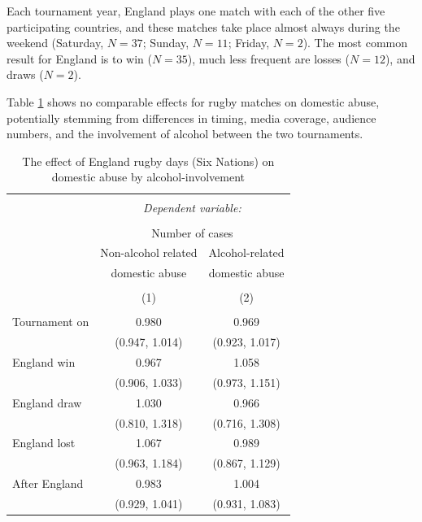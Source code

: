 \documentclass[12pt, a4paper]{article}
\begin{document}
Each tournament year, England plays one match with each of the other five participating countries, and these matches take place almost always during the weekend (Saturday, $N = 37$; Sunday, $N = 11$; Friday, $N = 2$). The most common result for England is to win ($N = 35$), much less frequent are losses ($N = 12$), and draws ($N = 2$).


Table \ref{rugby} shows no comparable effects for rugby matches on domestic abuse, potentially stemming from differences in timing, media coverage, audience numbers, and the involvement of alcohol between the two tournaments. 


\begin{table}[!htbp] \centering 
  \begin{threeparttable}
  \caption{The effect of England rugby days (Six Nations) on domestic abuse by alcohol-involvement} 
  \label{rugby} 
\begin{tabular}{@{\extracolsep{5pt}}lcc} 
\\[-1.8ex]\hline 
\hline \\[-1.8ex] 
 & \multicolumn{2}{c}{\textit{Dependent variable:}} \\ 
\cline{2-3} 
\\[-1.8ex] & \multicolumn{2}{c}{Number of cases} \\ 
 & Non-alcohol related & Alcohol-related\\ 
 & domestic abuse & domestic abuse\\
\\[-1.8ex] & (1) & (2)\\ 
\hline \\[-1.8ex] 
 Tournament on & 0.980 & 0.969 \\ 
  & (0.947, 1.014) & (0.923, 1.017) \\ 
 England win & 0.967 & 1.058 \\ 
  & (0.906, 1.033) & (0.973, 1.151) \\ 
 England draw & 1.030 & 0.966 \\ 
  & (0.810, 1.318) & (0.716, 1.308) \\ 
 England lost & 1.067 & 0.989 \\ 
  & (0.963, 1.184) & (0.867, 1.129) \\ 
 After England & 0.983 & 1.004 \\ 
  & (0.929, 1.041) & (0.931, 1.083) \\ 

\end{tabular}
\end{threeparttable}
\end{table}
\end{document}
